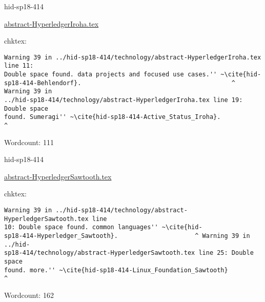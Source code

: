 

\begin{IU}

hid-sp18-414

\href{https://github.com/cloudmesh-community/hid-sp18-414/blob/master//technology/abstract-HyperledgerIroha.tex}{abstract-HyperledgerIroha.tex}

 
chktex:
\begin{tiny}
\begin{verbatim}
Warning 39 in ../hid-sp18-414/technology/abstract-HyperledgerIroha.tex line 11:
Double space found. data projects and focused use cases.'' ~\cite{hid-
sp18-414-Behlendorf}.                                         ^ Warning 39 in
../hid-sp18-414/technology/abstract-HyperledgerIroha.tex line 19: Double space
found. Sumeragi'' ~\cite{hid-sp18-414-Active_Status_Iroha}.             ^
\end{verbatim}
\end{tiny}

Wordcount: 111

\end{IU}



\begin{IU}

hid-sp18-414

\href{https://github.com/cloudmesh-community/hid-sp18-414/blob/master//technology/abstract-HyperledgerSawtooth.tex}{abstract-HyperledgerSawtooth.tex}

 
chktex:
\begin{tiny}
\begin{verbatim}
Warning 39 in ../hid-sp18-414/technology/abstract-HyperledgerSawtooth.tex line
10: Double space found. common languages'' ~\cite{hid-
sp18-414-Hyperledger_Sawtooth}.                     ^ Warning 39 in ../hid-
sp18-414/technology/abstract-HyperledgerSawtooth.tex line 25: Double space
found. more.'' ~\cite{hid-sp18-414-Linux_Foundation_Sawtooth}          ^
\end{verbatim}
\end{tiny}

Wordcount: 162

\end{IU}



